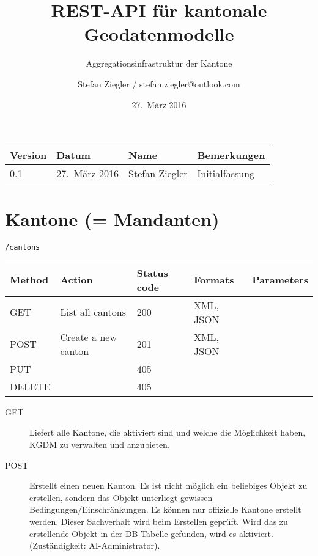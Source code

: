 \documentclass[12pt]{scrartcl}
\title{REST-API für kantonale Geodatenmodelle}
\subtitle{Aggregationsinfrastruktur der Kantone}
\author{Stefan Ziegler / stefan.ziegler@outlook.com}
\date{27.~März 2016}
\begin{document}
\maketitle

\begin{table}[ht]
\centering  
\begin{tabular}{| l | l | l | l |}  
\hline
\textbf{Version} & \textbf{Datum} & \textbf{Name} & \textbf{Bemerkungen} \\ 
\hline  
0.1 & 27.~März 2016 & Stefan Ziegler & Initialfassung \\ 
\hline 
\end{tabular}
\end{table}

\tableofcontents

\section{Kantone (= Mandanten)}

\texttt{/cantons}

\begin{table}[ht]
\begin{tabular}{| l | l | l | l | l |}  
\hline
\textbf{Method} & \textbf{Action} & \textbf{Status code} & \textbf{Formats} & \textbf{Parameters} \\
\hline  
GET & List all cantons & 200 & XML, JSON & \\ 
\hline 
POST & Create a new canton & 201 & XML, JSON & \\ 
\hline 
PUT & & 405 & & \\ 
\hline 
DELETE & & 405 & & \\ 
\hline 
\end{tabular}
\end{table}

\begin{description}
    \item[GET] Liefert alle Kantone, die aktiviert sind und welche die Möglichkeit haben, KGDM zu verwalten und anzubieten.
    \item[POST] Erstellt einen neuen Kanton. Es ist nicht möglich ein beliebiges Objekt zu erstellen, sondern das Objekt unterliegt gewissen Bedingungen/Einschränkungen. Es können nur offizielle Kantone erstellt werden. Dieser Sachverhalt wird beim Erstellen geprüft. Wird das zu erstellende Objekt in der DB-Tabelle gefunden, wird es aktiviert. (Zuständigkeit: AI-Administrator).
\end{description}
\end{document}
